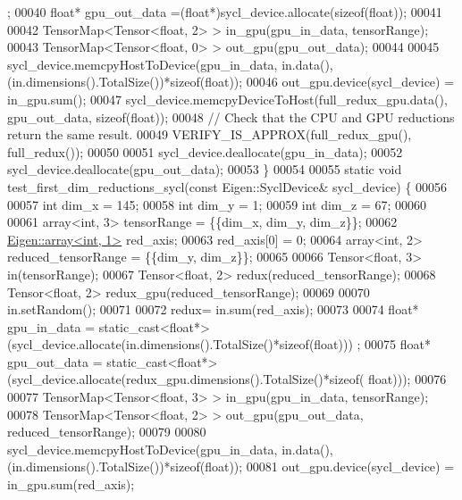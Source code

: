 \begin{DoxyCode}
      ;
00040   \textcolor{keywordtype}{float}* gpu\_out\_data =(\textcolor{keywordtype}{float}*)sycl\_device.allocate(\textcolor{keyword}{sizeof}(\textcolor{keywordtype}{float}));
00041 
00042   TensorMap<Tensor<float, 2> >  in\_gpu(gpu\_in\_data, tensorRange);
00043   TensorMap<Tensor<float, 0> >  out\_gpu(gpu\_out\_data);
00044 
00045   sycl\_device.memcpyHostToDevice(gpu\_in\_data, in.data(),(in.dimensions().TotalSize())*\textcolor{keyword}{sizeof}(\textcolor{keywordtype}{float}));
00046   out\_gpu.device(sycl\_device) = in\_gpu.sum();
00047   sycl\_device.memcpyDeviceToHost(full\_redux\_gpu.data(), gpu\_out\_data, \textcolor{keyword}{sizeof}(float));
00048   \textcolor{comment}{// Check that the CPU and GPU reductions return the same result.}
00049   VERIFY\_IS\_APPROX(full\_redux\_gpu(), full\_redux());
00050 
00051   sycl\_device.deallocate(gpu\_in\_data);
00052   sycl\_device.deallocate(gpu\_out\_data);
00053 \}
00054 
00055 \textcolor{keyword}{static} \textcolor{keywordtype}{void} test\_first\_dim\_reductions\_sycl(\textcolor{keyword}{const} Eigen::SyclDevice& sycl\_device) \{
00056 
00057   \textcolor{keywordtype}{int} dim\_x = 145;
00058   \textcolor{keywordtype}{int} dim\_y = 1;
00059   \textcolor{keywordtype}{int} dim\_z = 67;
00060 
00061   array<int, 3> tensorRange = \{\{dim\_x, dim\_y, dim\_z\}\};
00062   \hyperlink{class_eigen_1_1array}{Eigen::array<int, 1>} red\_axis;
00063   red\_axis[0] = 0;
00064   array<int, 2> reduced\_tensorRange = \{\{dim\_y, dim\_z\}\};
00065 
00066   Tensor<float, 3> in(tensorRange);
00067   Tensor<float, 2> redux(reduced\_tensorRange);
00068   Tensor<float, 2> redux\_gpu(reduced\_tensorRange);
00069 
00070   in.setRandom();
00071 
00072   redux= in.sum(red\_axis);
00073 
00074   \textcolor{keywordtype}{float}* gpu\_in\_data = \textcolor{keyword}{static\_cast<}\textcolor{keywordtype}{float}*\textcolor{keyword}{>}(sycl\_device.allocate(in.dimensions().TotalSize()*\textcolor{keyword}{sizeof}(float)))
      ;
00075   \textcolor{keywordtype}{float}* gpu\_out\_data = \textcolor{keyword}{static\_cast<}\textcolor{keywordtype}{float}*\textcolor{keyword}{>}(sycl\_device.allocate(redux\_gpu.dimensions().TotalSize()*\textcolor{keyword}{sizeof}(
      float)));
00076 
00077   TensorMap<Tensor<float, 3> >  in\_gpu(gpu\_in\_data, tensorRange);
00078   TensorMap<Tensor<float, 2> >  out\_gpu(gpu\_out\_data, reduced\_tensorRange);
00079 
00080   sycl\_device.memcpyHostToDevice(gpu\_in\_data, in.data(),(in.dimensions().TotalSize())*\textcolor{keyword}{sizeof}(\textcolor{keywordtype}{float}));
00081   out\_gpu.device(sycl\_device) = in\_gpu.sum(red\_axis);

\end{DoxyCode}
